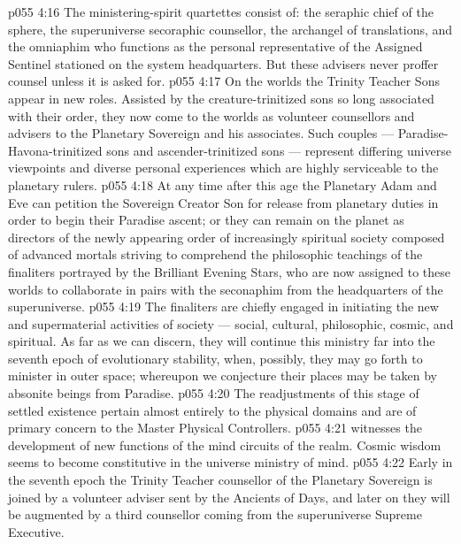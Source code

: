 \vs p055 4:16 The ministering\hyp{}spirit quartettes consist of: the seraphic chief of the sphere, the superuniverse secoraphic counsellor, the archangel of translations, and the omniaphim who functions as the personal representative of the Assigned Sentinel stationed on the system headquarters. But these advisers never proffer counsel unless it is asked for.
\vs p055 4:17 \bibnobreakspace {} On the worlds the Trinity Teacher Sons appear in new roles. Assisted by the creature\hyp{}trinitized sons so long associated with their order, they now come to the worlds as volunteer counsellors and advisers to the Planetary Sovereign and his associates. Such couples --- Paradise\hyp{}Havona\hyp{}trinitized sons and ascender\hyp{}trinitized sons --- represent differing universe viewpoints and diverse personal experiences which are highly serviceable to the planetary rulers.
\vs p055 4:18 At any time after this age the Planetary Adam and Eve can petition the Sovereign Creator Son for release from planetary duties in order to begin their Paradise ascent; or they can remain on the planet as directors of the newly appearing order of increasingly spiritual society composed of advanced mortals striving to comprehend the philosophic teachings of the finaliters portrayed by the Brilliant Evening Stars, who are now assigned to these worlds to collaborate in pairs with the seconaphim from the headquarters of the superuniverse.
\vs p055 4:19 The finaliters are chiefly engaged in initiating the new and supermaterial activities of society --- social, cultural, philosophic, cosmic, and spiritual. As far as we can discern, they will continue this ministry far into the seventh epoch of evolutionary stability, when, possibly, they may go forth to minister in outer space; whereupon we conjecture their places may be taken by absonite beings from Paradise.
\vs p055 4:20 \bibnobreakspace {} The readjustments of this stage of settled existence pertain almost entirely to the physical domains and are of primary concern to the Master Physical Controllers.
\vs p055 4:21 \bibnobreakspace {} witnesses the development of new functions of the mind circuits of the realm. Cosmic wisdom seems to become constitutive in the universe ministry of mind.
\vs p055 4:22 \bibnobreakspace {} Early in the seventh epoch the Trinity Teacher counsellor of the Planetary Sovereign is joined by a volunteer adviser sent by the Ancients of Days, and later on they will be augmented by a third counsellor coming from the superuniverse Supreme Executive.
